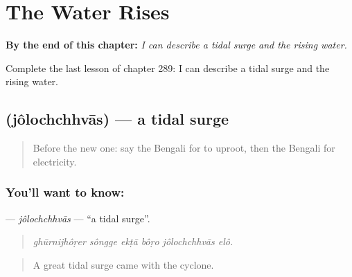 
\chapter{The Water Rises}
\label{ch:bn-the-water-rises}

\begin{chapteropening}
\textbf{By the end of this chapter:} \emph{I can describe a tidal surge and the rising water.}

Complete the last lesson of chapter 289: I can describe a tidal surge and the rising water.
\end{chapteropening}

\section[\texorpdfstring{\bn{জলোচ্ছ্বাস} (jôlochchhvās)}{জলোচ্ছ্বাস (jôlochchhvās)}]{ (jôlochchhvās) — a tidal surge}

\label{lesson:BN-C289-jolochchhvas}



\begin{quote}
Before the new one: say the Bengali for to uproot, then the Bengali for electricity.
\end{quote}

\subsection*{You'll want to know: }
\textbf{} — \emph{jôlochchhvās} — \textquotedblleft{}a tidal surge\textquotedblright{}.

\begin{quote}
     
\end{quote}

\begin{quote}
\emph{ghūrnijhôṛer sôngge ekṭā bôṛo jôlochchhvās elô.}
\end{quote}

\begin{quote}
A great tidal surge came with the cyclone.
\end{quote}

